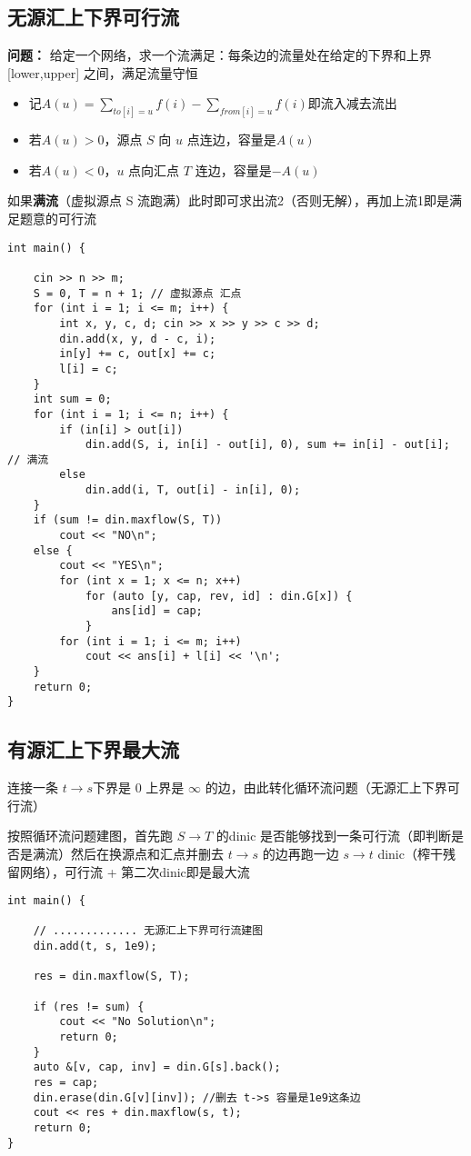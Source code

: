 \subsection{无源汇上下界可行流}
\par \textbf{问题：} 给定一个网络，求一个流满足：每条边的流量处在给定的下界和上界 [lower,upper] 之间，满足流量守恒

\begin{itemize}
\item 记$A(u)=\sum_{to [i]=u}f(i)-\sum_{from[i]=u}f(i)$即流入减去流出
\item 若$A(u)>0$，源点 $S$ 向 $u$ 点连边，容量是$A(u)$
\item 若$A(u)<0$，$u$ 点向汇点 $T$ 连边，容量是$-A(u)$
\end{itemize}
如果\textbf{满流}（虚拟源点 S 流跑满）此时即可求出流2（否则无解），再加上流1即是满足题意的可行流
\begin{verbatim}
int main() {

    cin >> n >> m;
    S = 0, T = n + 1; // 虚拟源点 汇点
    for (int i = 1; i <= m; i++) {
        int x, y, c, d; cin >> x >> y >> c >> d;
        din.add(x, y, d - c, i);
        in[y] += c, out[x] += c;
        l[i] = c;
    }
    int sum = 0;
    for (int i = 1; i <= n; i++) {
        if (in[i] > out[i])
            din.add(S, i, in[i] - out[i], 0), sum += in[i] - out[i]; // 满流
        else
            din.add(i, T, out[i] - in[i], 0);
    }
    if (sum != din.maxflow(S, T))
        cout << "NO\n";
    else {
        cout << "YES\n";
        for (int x = 1; x <= n; x++)
            for (auto [y, cap, rev, id] : din.G[x]) {
                ans[id] = cap;
            }
        for (int i = 1; i <= m; i++)
            cout << ans[i] + l[i] << '\n';
    }
    return 0;
}
\end{verbatim}
\subsection{有源汇上下界最大流}
\par \noindent 连接一条 $t\to s$下界是 0 上界是 $\infty$ 的边，由此转化循环流问题（无源汇上下界可行流）
\par \noindent 
\par \noindent 按照循环流问题建图，首先跑 $S \to T$ 的dinic 是否能够找到一条可行流（即判断是否是满流）然后在换源点和汇点并删去 $t\to s$ 的边再跑一边 $s\to t$ dinic（榨干残留网络），可行流 + 第二次dinic即是最大流
\begin{verbatim}
int main() {

    // ............. 无源汇上下界可行流建图
    din.add(t, s, 1e9);

    res = din.maxflow(S, T);

    if (res != sum) {
        cout << "No Solution\n";
        return 0;
    }
    auto &[v, cap, inv] = din.G[s].back();
    res = cap;
    din.erase(din.G[v][inv]); //删去 t->s 容量是1e9这条边
    cout << res + din.maxflow(s, t);
    return 0;
}
\end{verbatim}

